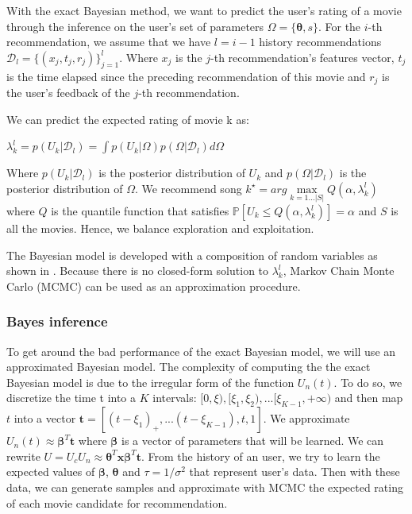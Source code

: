 \documentclass[letterpaper]{article}
\begin{document}
With the exact Bayesian method, we want to predict the user's rating of a movie through the inference on the user's set of parameters $\Omega = \lbrace \boldsymbol{\theta} , s \rbrace $. For the $i$-th recommendation, we assume that we have $l = i-1$ history recommendations $ \mathcal{D}_l = \lbrace (x_j, t_j, r_j) \rbrace^l_{j=1}$. Where $x_j$ is the $j$-th recommendation's features vector, $t_j$ is the time elapsed since the preceding recommendation of this movie and $r_j$ is the user's feedback of the $j$-th recommendation.

We can predict the expected rating of movie k as:
\begin{center}
$\lambda^l_k = p(U_k | \mathcal{D}_l) = \int p(U_k|\Omega)p(\Omega| \mathcal{D}_l)d\Omega$
\end{center}
Where $p(U_k|\mathcal{D}_l)$ is the posterior distribution of $U_k$ and $ p(\Omega| \mathcal{D}_l) $ is the posterior distribution of $ \Omega $. We recommend song $k^{\star} = arg \max\limits_{k=1...|S|} Q(\alpha, \lambda^l_k)$ where $Q$ is the quantile function that satisfies $ \mathbb{P} [ U_k \le Q(\alpha, \lambda^l_k) ]=\alpha$ and $S$ is all the movies. 
Hence, we balance exploration and exploitation.

The Bayesian model is developed with a composition of random variables as shown in \cite{main}. Because there is no closed-form solution to $ \lambda^l_k$, Markov Chain Monte Carlo (MCMC) can be used as an approximation procedure.

\subsubsection{Bayes inference}


To get around the bad performance of the exact Bayesian model, we will use an approximated Bayesian model. The complexity of computing the the exact Bayesian model is due to the irregular form of the function $U_n(t)$. To do so, we discretize the time t into a $K$ intervals: $ [0, \xi), [\xi_1,\xi_2),...[\xi_{K-1}, +\infty)$ and then map $t$ into a vector $\boldsymbol{t} = [(t-\xi_1)_{+},...(t-\xi_{K-1}),t,1]$. We approximate $U_n(t) \approx \boldsymbol{\beta}^{T}\boldsymbol{t} $ where $ \boldsymbol{\beta}$ is a vector of parameters that will be learned. We can rewrite $ U = U_c U_n \approx \boldsymbol{\theta}^{T} \boldsymbol{x} \boldsymbol{\beta}^{T} \boldsymbol{t} $. From the history of an user, we try to learn the expected values of $\boldsymbol{\beta}$, $\boldsymbol{\theta}$ and $\tau = 1/\sigma^2$ that represent user's data. Then with these data, we can generate samples and approximate with MCMC the expected rating of each movie candidate for recommendation.
\end{document}
